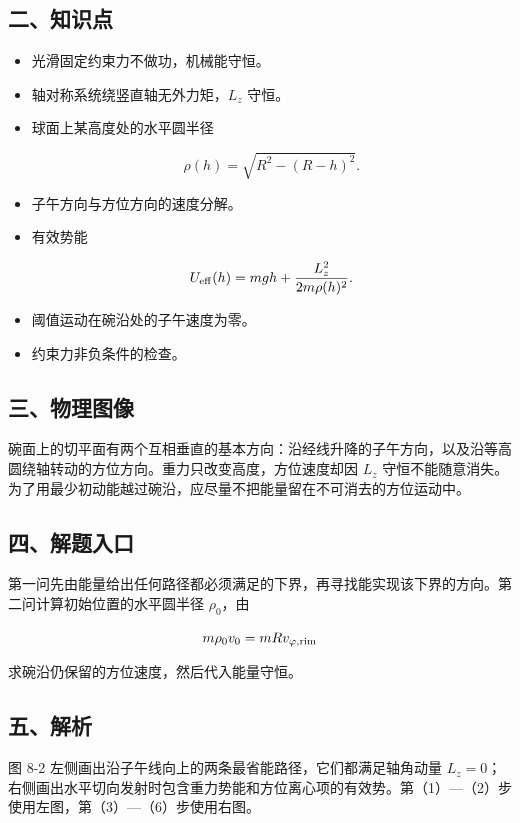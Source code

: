 \documentclass[12pt,a4paper,UTF8]{ctexart}
\begin{document}
\subsection{二、知识点}\label{ux4e8cux77e5ux8bc6ux70b9-7}

\begin{itemize}
\item
  光滑固定约束力不做功，机械能守恒。
\item
  轴对称系统绕竖直轴无外力矩，\(L_z\) 守恒。
\item
  球面上某高度处的水平圆半径

  \[\rho(h)=\sqrt{R^2-(R-h)^2}.\]
\item
  子午方向与方位方向的速度分解。
\item
  有效势能

  \[U_{\rm eff}(h)=mgh+\frac{L_z^2}{2m\rho(h)^2}.\]
\item
  阈值运动在碗沿处的子午速度为零。
\item
  约束力非负条件的检查。
\end{itemize}

\subsection{三、物理图像}\label{ux4e09ux7269ux7406ux56feux50cf-7}

碗面上的切平面有两个互相垂直的基本方向：沿经线升降的子午方向，以及沿等高圆绕轴转动的方位方向。重力只改变高度，方位速度却因
\(L_z\)
守恒不能随意消失。为了用最少初动能越过碗沿，应尽量不把能量留在不可消去的方位运动中。

\subsection{四、解题入口}\label{ux56dbux89e3ux9898ux5165ux53e3-7}

第一问先由能量给出任何路径都必须满足的下界，再寻找能实现该下界的方向。第二问计算初始位置的水平圆半径
\(\rho_0\)，由

\[m\rho_0v_0=mRv_{\varphi,\rm rim}\]

求碗沿仍保留的方位速度，然后代入能量守恒。

\subsection{五、解析}\label{ux4e94ux89e3ux6790-7}

图 8-2 左侧画出沿子午线向上的两条最省能路径，它们都满足轴角动量
\(L_z=0\)；右侧画出水平切向发射时包含重力势能和方位离心项的有效势。第（1）---（2）步使用左图，第（3）---（6）步使用右图。
\end{document}
